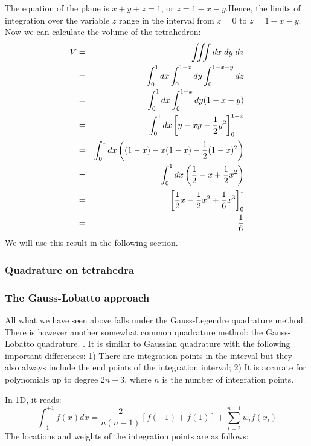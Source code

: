 The equation of the plane is $x+y+z=1$, or $z=1-x-y$.Hence, the limits of integration over 
the variable $z$ range in the interval from
$z=0$ to $z=1-x-y$. Now we can calculate the volume of the tetrahedron:
\begin{eqnarray}
V 
&=& \iiint dx \; dy \; dz \nonumber\\
&=& \int_0^1 dx \int_0^{1-x} dy \int_{0}^{1-x-y} dz \nonumber\\
&=& \int_0^1 dx \int_0^{1-x} dy (1-x-y) \nonumber\\
&=& \int_0^1 dx \left[y-xy-\frac12 y^2 \right]_0^{1-x} \nonumber\\
&=& \int_0^1 dx \left((1-x)-x(1-x)-\frac12 (1-x)^2 \right) \nonumber\\
&=& \int_0^1 dx \left(\frac12 -x + \frac12 x^2   \right) \nonumber\\
&=& \left[ \frac12 x  -\frac12 x^2 + \frac16 x^3   \right]_0^1 \nonumber\\
&=& \frac16
\end{eqnarray}
We will use this result in the following section.

\subsubsection{Quadrature on tetrahedra}




\subsubsection{The Gauss-Lobatto approach \label{sec:loba}}

All what we have seen above falls under the Gauss-Legendre quadrature method. There is however another 
somewhat common quadrature method: the Gauss-Lobatto  quadrature. .
It is similar to Gaussian quadrature with the following  important differences:
1) There are integration points in the interval but they also always include the end points of the integration interval;
2) It is accurate for polynomials up to degree $2n-3$, where $n$ is the number of integration points.

In 1D, it reads:
\[
\int_{-1}^{+1} f(x) dx = \frac{2}{n(n-1)} [f(-1)+f(1)] + \sum_{i=2}^{n-1} w_i f(x_i) 
\]
The locations and weights of the integration points are as follows:

